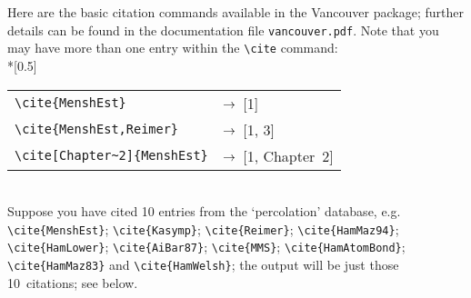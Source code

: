 Here are the basic citation commands available in the Vancouver package; further details can be found in the documentation file \verb"vancouver.pdf". Note that you may have more than one entry within the \verb"\cite" command:\\*[0.5\baselineskip]
\begin{tabular}{@{}ll@{}}
\verb"\cite{MenshEst}"
    & $\rightarrow\enskip$[1]\\
\verb"\cite{MenshEst,Reimer}"
    & $\rightarrow\enskip$[1, 3]\\
\verb"\cite[Chapter~2]{MenshEst}"
    & $\rightarrow\enskip$[1, Chapter~2]\\
\end{tabular}\\[0.5\baselineskip]
%
\noindent Suppose you have cited 10 entries from the `percolation' database, e.g. \verb"\cite{MenshEst}"; \verb"\cite{Kasymp}"; \verb"\cite{Reimer}"; \verb"\cite{HamMaz94}"; \verb"\cite{HamLower}"; \verb"\cite{AiBar87}"; \verb"\cite{MMS}"; \verb"\cite{HamAtomBond}";  \verb"\cite{HamMaz83}" and \verb"\cite{HamWelsh}"; the output will be just those 10~citations; see below.

